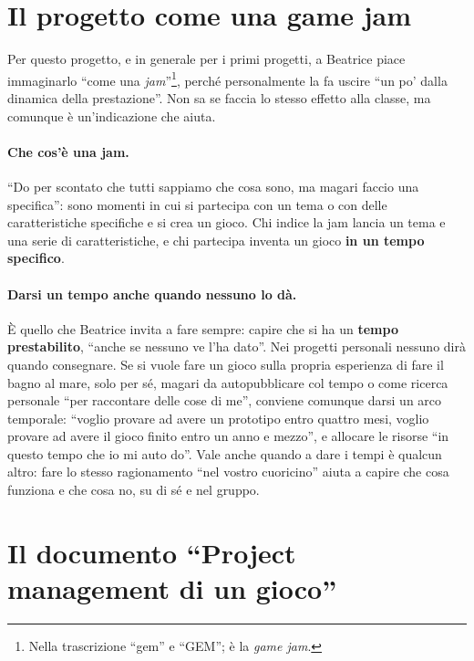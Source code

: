 \section{Il progetto come una game jam}
\label{a9:sec:jam}



Per questo progetto, e in generale per i primi progetti, a Beatrice piace
immaginarlo ``come una \emph{jam}''\footnote{Nella trascrizione ``gem'' e ``GEM'';
è la \emph{game jam}.}, perché personalmente la fa uscire ``un po' dalla dinamica
della prestazione''. Non sa se faccia lo stesso effetto alla classe, ma comunque è
un'indicazione che aiuta.

\paragraph{Che cos'è una jam.} ``Do per scontato che tutti sappiamo che cosa sono, ma
magari faccio una specifica'': sono momenti in cui si partecipa con un tema o con
delle caratteristiche specifiche e si crea un gioco. Chi indice la jam lancia un tema
e una serie di caratteristiche, e chi partecipa inventa un gioco \textbf{in un tempo
specifico}.

\paragraph{Darsi un tempo anche quando nessuno lo dà.} È quello che Beatrice invita a
fare sempre: capire che si ha un \textbf{tempo prestabilito}, ``anche se nessuno ve
l'ha dato''. Nei progetti personali nessuno dirà quando consegnare. Se si vuole fare
un gioco sulla propria esperienza di fare il bagno al mare, solo per sé, magari da
autopubblicare col tempo o come ricerca personale ``per raccontare delle cose di me'',
conviene comunque darsi un arco temporale: ``voglio provare ad avere un prototipo
entro quattro mesi, voglio provare ad avere il gioco finito entro un anno e mezzo'', e
allocare le risorse ``in questo tempo che io mi auto do''. Vale anche quando a dare i
tempi è qualcun altro: fare lo stesso ragionamento ``nel vostro cuoricino'' aiuta a
capire che cosa funziona e che cosa no, su di sé e nel gruppo.

\section{Il documento ``Project management di un gioco''}
\label{a9:sec:documento}

